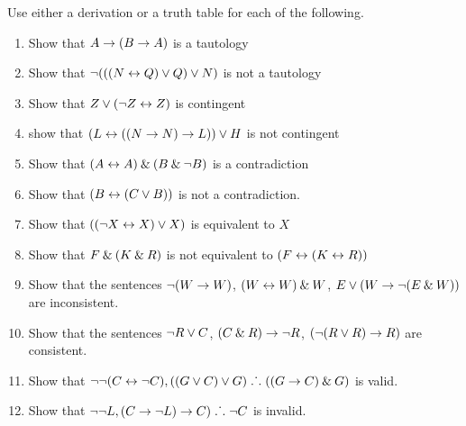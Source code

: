 \noindent\problempart Use either a derivation or a truth table for each of the following. 
\begin{enumerate}%
\item Show that $A \rightarrow (B \rightarrow A)$ is a tautology
\item Show that ${\neg} (((N \leftrightarrow Q) \vee Q) \vee N)$ is not a tautology
\item Show that $ Z \vee ({\neg} Z \leftrightarrow Z) $ is contingent
\item show that $ (L \leftrightarrow ((N \rightarrow N) \rightarrow L)) \vee H $ is not contingent
\item Show that $ (A \leftrightarrow A) \mathbin{\&} (B \mathbin{\&} {\neg} B)$ is a contradiction
\item Show that $ (B \leftrightarrow (C \vee B)) $ is not a contradiction.
\item Show that $ (({\neg} X \leftrightarrow X) \vee X) $ is equivalent to $X$
\item Show that $F \mathbin{\&} (K \mathbin{\&} R) $ is not equivalent to $ (F \leftrightarrow (K \leftrightarrow R)) $
\item Show that the sentences $ {\neg} (W \rightarrow W)$, $(W \leftrightarrow W) \mathbin{\&} W$, $E \vee (W \rightarrow {\neg} (E \mathbin{\&} W))$ are inconsistent.
\item Show that the sentences  ${\neg} R \vee C $, $(C \mathbin{\&} R) \rightarrow {\neg} R$, $({\neg} (R \vee R) \rightarrow R) $ are consistent.
\item Show that ${\neg} {\neg} (C \leftrightarrow {\neg} C), ((G \vee C) \vee G) \mathrel{\ldotp\dot{}\,\ldotp} ((G \rightarrow C) \mathbin{\&} G) $ is valid.
\item Show that $ {\neg} {\neg} L,  (C \rightarrow {\neg} L) \rightarrow C) \mathrel{\ldotp\dot{}\,\ldotp} {\neg} C$ is invalid. 
\end{enumerate}

